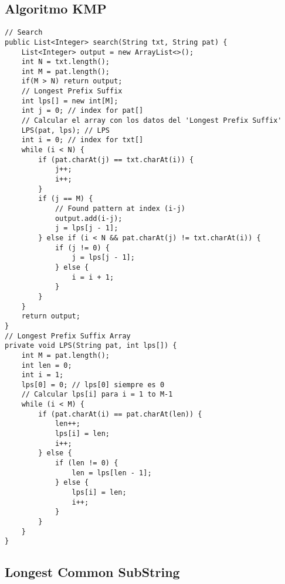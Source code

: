 \documentclass[10pt,letterpaper,twocolumn,twosided]{article}
\begin{document}
\subsection{Algoritmo KMP}
\begin{lstlisting}
// Search
public List<Integer> search(String txt, String pat) {
    List<Integer> output = new ArrayList<>();
    int N = txt.length();
    int M = pat.length();
    if(M > N) return output;
    // Longest Prefix Suffix
    int lps[] = new int[M]; 
    int j = 0; // index for pat[]
    // Calcular el array con los datos del 'Longest Prefix Suffix'
    LPS(pat, lps); // LPS
    int i = 0; // index for txt[] 
    while (i < N) { 
        if (pat.charAt(j) == txt.charAt(i)) { 
            j++; 
            i++; 
        }
        if (j == M) {
            // Found pattern at index (i-j)
            output.add(i-j);
            j = lps[j - 1]; 
        } else if (i < N && pat.charAt(j) != txt.charAt(i)) { 
            if (j != 0) {
                j = lps[j - 1]; 
            } else {
                i = i + 1; 
            }
        } 
    }
    return output;
}
// Longest Prefix Suffix Array
private void LPS(String pat, int lps[]) { 
    int M = pat.length();
    int len = 0; 
    int i = 1; 
    lps[0] = 0; // lps[0] siempre es 0
    // Calcular lps[i] para i = 1 to M-1 
    while (i < M) { 
        if (pat.charAt(i) == pat.charAt(len)) { 
            len++; 
            lps[i] = len; 
            i++; 
        } else { 
            if (len != 0) { 
                len = lps[len - 1]; 
            } else { 
                lps[i] = len; 
                i++; 
            } 
        } 
    }
}
\end{lstlisting}

\subsection{Longest Common SubString}
\begin{lstlisting}

\end{lstlisting}
\end{document}
